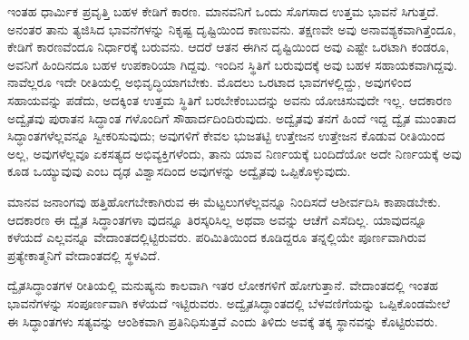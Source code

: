 ಇಂತಹ ಧಾರ್ಮಿಕ ಪ್ರವೃತ್ತಿ ಬಹಳ ಕೇಡಿಗೆ ಕಾರಣ. ಮಾನವನಿಗೆ ಒಂದು ಸೊಗಸಾದ ಉತ್ತಮ ಭಾವನೆ ಸಿಗುತ್ತದೆ. ಅನಂತರ ತಾನು ತ್ಯಜಿಸಿದ ಭಾವನೆಗಳನ್ನು ನಿಕೃಷ್ಟ ದೃಷ್ಟಿಯಿಂದ ಕಾಣುವನು. ತಕ್ಷಣವೇ ಅವು ಅನಾವಶ್ಯಕವಾಗಿತ್ತೆಂದೂ, ಕೇಡಿಗೆ ಕಾರಣವೆಂದೂ ನಿರ್ಧಾರಕ್ಕೆ ಬರುವನು. ಆದರೆ ಆತನ ಈಗಿನ ದೃಷ್ಟಿಯಿಂದ ಅವು ಎಷ್ಟೇ ಒರಟಾಗಿ ಕಂಡರೂ, ಅವನಿಗೆ ಹಿಂದಿನದೂ ಬಹಳ ಉಪಕಾರಿಯಾ ಗಿದ್ದವು. ಇಂದಿನ ಸ್ಥಿತಿಗೆ ಬರುವುದಕ್ಕೆ ಅವು ಬಹಳ ಸಹಾಯಕವಾಗಿದ್ದವು. ನಾವೆಲ್ಲರೂ ಇದೇ ರೀತಿಯಲ್ಲಿ ಅಭಿವೃದ್ಧಿಯಾಗಬೇಕು. ಮೊದಲು ಒರಟಾದ ಭಾವಗಳಲ್ಲಿದ್ದು, ಅವುಗಳಿಂದ ಸಹಾಯವನ್ನು ಪಡೆದು, ಅದಕ್ಕಿಂತ ಉತ್ತಮ ಸ್ಥಿತಿಗೆ ಬರಬೇಕೆಂಬುದನ್ನು ಅವನು ಯೋಚಿಸುವುದೇ ಇಲ್ಲ. ಆದಕಾರಣ ಅದ್ವೈತವು ಪುರಾತನ ಸಿದ್ಧಾಂತ ಗಳೊಂದಿಗೆ ಸೌಹಾರ್ದದಿಂದಿರುವುದು. ಅದ್ವೈತವು ತನಗೆ ಹಿಂದೆ ಇದ್ದ ದ್ವೈತ ಮುಂತಾದ ಸಿದ್ಧಾಂತಗಳೆಲ್ಲವನ್ನೂ ಸ್ವೀಕರಿಸುವುದು; ಅವುಗಳಿಗೆ ಕೇವಲ ಭುಜತಟ್ಟಿ ಉತ್ತೇಜನ ಉತ್ತೇಜನ ಕೊಡುವ ರೀತಿಯಿಂದ ಅಲ್ಲ, ಅವುಗಳೆಲ್ಲವೂ ಏಕಸತ್ಯದ ಅಭಿವ್ಯಕ್ತಿಗಳೆಂದು, ತಾನು ಯಾವ ನಿರ್ಣಯಕ್ಕೆ ಬಂದಿದೆಯೋ ಅದೇ ನಿರ್ಣಯಕ್ಕೆ ಅವು ಕೂಡ ಒಯ್ಯುವುವು ಎಂಬ ದೃಢ ವಿಶ್ವಾಸದಿಂದ ಅವುಗಳನ್ನು ಅದ್ವೈತವು ಒಪ್ಪಿಕೊಳ್ಳುವುದು.

ಮಾನವ ಜನಾಂಗವು ಹತ್ತಿಹೋಗಬೇಕಾಗಿರುವ ಈ ಮೆಟ್ಟಲುಗಳೆಲ್ಲವನ್ನೂ ನಿಂದಿಸದೆ ಆಶೀರ್ವದಿಸಿ ಕಾಪಾಡಬೇಕು. ಆದಕಾರಣ ಈ ದ್ವೈತ ಸಿದ್ಧಾಂತಗಳಾ ವುದನ್ನೂ ತಿರಸ್ಕರಿಸಿಲ್ಲ ಅಥವಾ ಅವನ್ನು ಆಚೆಗೆ ಎಸೆದಿಲ್ಲ. ಯಾವುದನ್ನೂ ಕಳೆಯದೆ ಎಲ್ಲವನ್ನೂ ವೇದಾಂತದಲ್ಲಿಟ್ಟಿರುವರು. ಪರಿಮಿತಿಯಿಂದ ಕೂಡಿದ್ದರೂ ತನ್ನಲ್ಲಿಯೇ ಪೂರ್ಣವಾಗಿರುವ ಪ್ರತ್ಯೇಕಾತ್ಮನಿಗೆ ವೇದಾಂತದಲ್ಲಿ ಸ್ಥಳವಿದೆ.

ದ್ವೈತಸಿದ್ಧಾಂತಗಳ ರೀತಿಯಲ್ಲಿ ಮನುಷ್ಯನು ಕಾಲವಾಗಿ ಇತರ ಲೋಕಗಳಿಗೆ ಹೋಗುತ್ತಾನೆ. ವೇದಾಂತದಲ್ಲಿ ಇಂತಹ ಭಾವನೆಗಳನ್ನು ಸಂಪೂರ್ಣವಾಗಿ ಕಳೆಯದೆ ಇಟ್ಟಿರುವರು. ಅದ್ವೈತಸಿದ್ಧಾಂತದಲ್ಲಿ ಬೆಳವಣಿಗೆಯನ್ನು ಒಪ್ಪಿಕೊಂಡಮೇಲೆ ಈ ಸಿದ್ಧಾಂತಗಳು ಸತ್ಯವನ್ನು ಆಂಶಿಕವಾಗಿ ಪ್ರತಿನಿಧಿಸುತ್ತವೆ ಎಂದು ತಿಳಿದು ಅವಕ್ಕೆ ತಕ್ಕ ಸ್ಥಾನವನ್ನು ಕೊಟ್ಟಿರುವರು.

